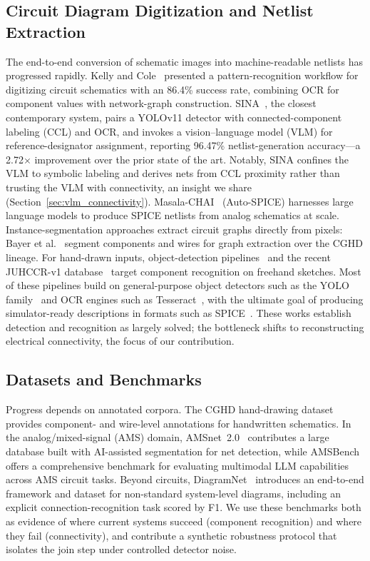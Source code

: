 \documentclass[conference]{IEEEtran}
\begin{document}
\subsection{Circuit Diagram Digitization and Netlist Extraction}
The end-to-end conversion of schematic images into machine-readable netlists has progressed rapidly. Kelly and Cole~\cite{kelly2024digitizing} presented a pattern-recognition workflow for digitizing circuit schematics with an 86.4\% success rate, combining OCR for component values with network-graph construction. SINA~\cite{sina2026}, the closest contemporary system, pairs a YOLOv11 detector with connected-component labeling (CCL) and OCR, and invokes a vision--language model (VLM) for reference-designator assignment, reporting 96.47\% netlist-generation accuracy---a 2.72$\times$ improvement over the prior state of the art. Notably, SINA confines the VLM to symbolic labeling and derives nets from CCL proximity rather than trusting the VLM with connectivity, an insight we share (Section~\ref{sec:vlm_connectivity}). Masala-CHAI~\cite{masalachai2024} (Auto-SPICE) harnesses large language models to produce SPICE netlists from analog schematics at scale. Instance-segmentation approaches extract circuit graphs directly from pixels: Bayer et al.~\cite{instanceseg2023} segment components and wires for graph extraction over the CGHD lineage. For hand-drawn inputs, object-detection pipelines~\cite{handdrawn2021} and the recent JUHCCR-v1 database~\cite{juhccr2025} target component recognition on freehand sketches. Most of these pipelines build on general-purpose object detectors such as the YOLO family~\cite{redmon2016yolo,jocher2023yolo} and OCR engines such as Tesseract~\cite{smith2007tesseract}, with the ultimate goal of producing simulator-ready descriptions in formats such as SPICE~\cite{nagel1973spice}. These works establish detection and recognition as largely solved; the bottleneck shifts to reconstructing electrical connectivity, the focus of our contribution.

\subsection{Datasets and Benchmarks}
Progress depends on annotated corpora. The CGHD hand-drawing dataset~\cite{bayer2021cghd} provides component- and wire-level annotations for handwritten schematics. In the analog/mixed-signal (AMS) domain, AMSnet~2.0~\cite{amsnet2025} contributes a large database built with AI-assisted segmentation for net detection, while AMSBench~\cite{amsbench2025} offers a comprehensive benchmark for evaluating multimodal LLM capabilities across AMS circuit tasks. Beyond circuits, DiagramNet~\cite{diagramnet2026} introduces an end-to-end framework and dataset for non-standard system-level diagrams, including an explicit connection-recognition task scored by F1. We use these benchmarks both as evidence of where current systems succeed (component recognition) and where they fail (connectivity), and contribute a synthetic robustness protocol that isolates the join step under controlled detector noise.
\end{document}
